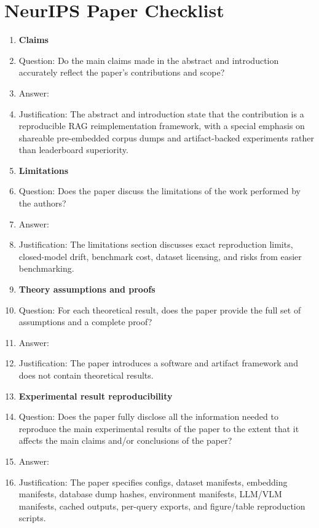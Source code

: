 \section*{NeurIPS Paper Checklist}

\begin{enumerate}

\item {\bf Claims}
\item[] Question: Do the main claims made in the abstract and introduction accurately reflect the paper's contributions and scope?
\item[] Answer: \answerYes{}
\item[] Justification: The abstract and introduction state that the contribution is a reproducible RAG reimplementation framework, with a special emphasis on shareable pre-embedded corpus dumps and artifact-backed experiments rather than leaderboard superiority.

\item {\bf Limitations}
\item[] Question: Does the paper discuss the limitations of the work performed by the authors?
\item[] Answer: \answerYes{}
\item[] Justification: The limitations section discusses exact reproduction limits, closed-model drift, benchmark cost, dataset licensing, and risks from easier benchmarking.

\item {\bf Theory assumptions and proofs}
\item[] Question: For each theoretical result, does the paper provide the full set of assumptions and a complete proof?
\item[] Answer: \answerNA{}
\item[] Justification: The paper introduces a software and artifact framework and does not contain theoretical results.

\item {\bf Experimental result reproducibility}
\item[] Question: Does the paper fully disclose all the information needed to reproduce the main experimental results of the paper to the extent that it affects the main claims and/or conclusions of the paper?
\item[] Answer: \answerYes{}
\item[] Justification: The paper specifies configs, dataset manifests, embedding manifests, database dump hashes, environment manifests, LLM/VLM manifests, cached outputs, per-query exports, and figure/table reproduction scripts.


\end{enumerate}

